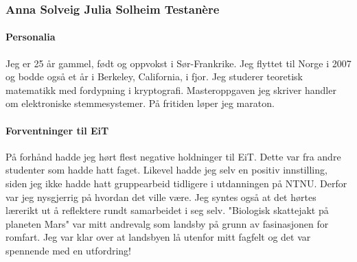 \subsubsection{Anna Solveig Julia Solheim Testan\`{e}re}

\paragraph{Personalia}
Jeg er 25 år gammel, født og oppvokst i Sør-Frankrike. Jeg flyttet til Norge i 2007 og bodde også et år i Berkeley, California, i fjor.
Jeg studerer teoretisk matematikk med fordypning i kryptografi. Masteroppgaven jeg skriver handler om elektroniske stemmesystemer. På fritiden løper jeg maraton.
\\
\paragraph{Forventninger til EiT}
På forhånd hadde jeg hørt flest negative holdninger til EiT.
Dette var fra andre studenter som hadde hatt faget.
Likevel hadde jeg selv en positiv innstilling, siden jeg ikke hadde hatt gruppearbeid tidligere i utdanningen på NTNU.
Derfor var jeg nysgjerrig på hvordan det ville være.
Jeg syntes også at det hørtes lærerikt ut å reflektere rundt samarbeidet i seg selv.
"Biologisk skattejakt på planeten Mars" var mitt andrevalg som landsby på grunn av fasinasjonen for romfart.
Jeg var klar over at landsbyen lå utenfor mitt fagfelt og det var spennende med en utfordring!
\\